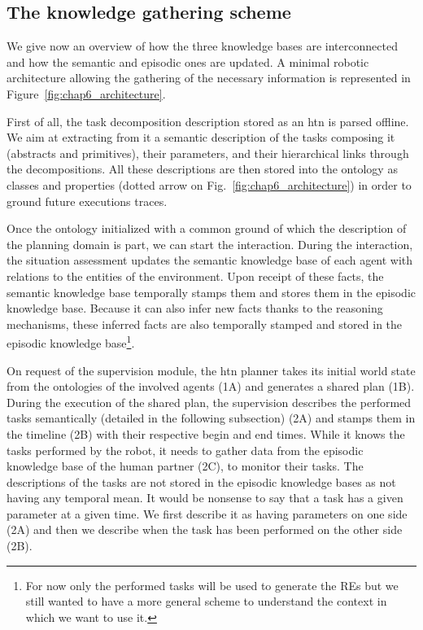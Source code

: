 \subsection{The knowledge gathering scheme}

We give now an overview of how the three knowledge bases are interconnected and how the semantic and episodic ones are updated. A minimal robotic architecture allowing the gathering of the necessary information is represented in Figure~\ref{fig:chap6_architecture}.

First of all, the task decomposition description stored as an \acrshort{htn} is parsed offline. We aim at extracting from it a semantic description of the tasks composing it (abstracts and primitives), their parameters, and their hierarchical links through the decompositions. All these descriptions are then stored into the ontology as classes and properties (dotted arrow on Fig.~\ref{fig:chap6_architecture}) in order to ground future executions traces.

Once the ontology initialized with a common ground of which the description of the planning domain is part, we can start the interaction. During the interaction, the situation assessment updates the semantic knowledge base of each agent with relations to the entities of the environment. Upon receipt of these facts, the semantic knowledge base temporally stamps them and stores them in the episodic knowledge base. Because it can also infer new facts thanks to the reasoning mechanisms, these inferred facts are also temporally stamped and stored in the episodic knowledge base\footnote{For now only the performed tasks will be used to generate the REs but we still wanted to have a more general scheme to understand the context in which we want to use it.}.

On request of the supervision module, the \acrshort{htn} planner takes its initial world state from the ontologies of the involved agents (1A) and generates a shared plan (1B). During the execution of the shared plan, the supervision describes the performed tasks semantically (detailed in the following subsection) (2A) and stamps them in the timeline (2B) with their respective begin and end times. While it knows the tasks performed by the robot, it needs to gather data from the episodic knowledge base of the human partner (2C), to monitor their tasks. The descriptions of the tasks are not stored in the episodic knowledge bases as not having any temporal mean. It would be nonsense to say that a task has a given parameter at a given time. We first describe it as having parameters on one side (2A) and then we describe when the task has been performed on the other side (2B). 

